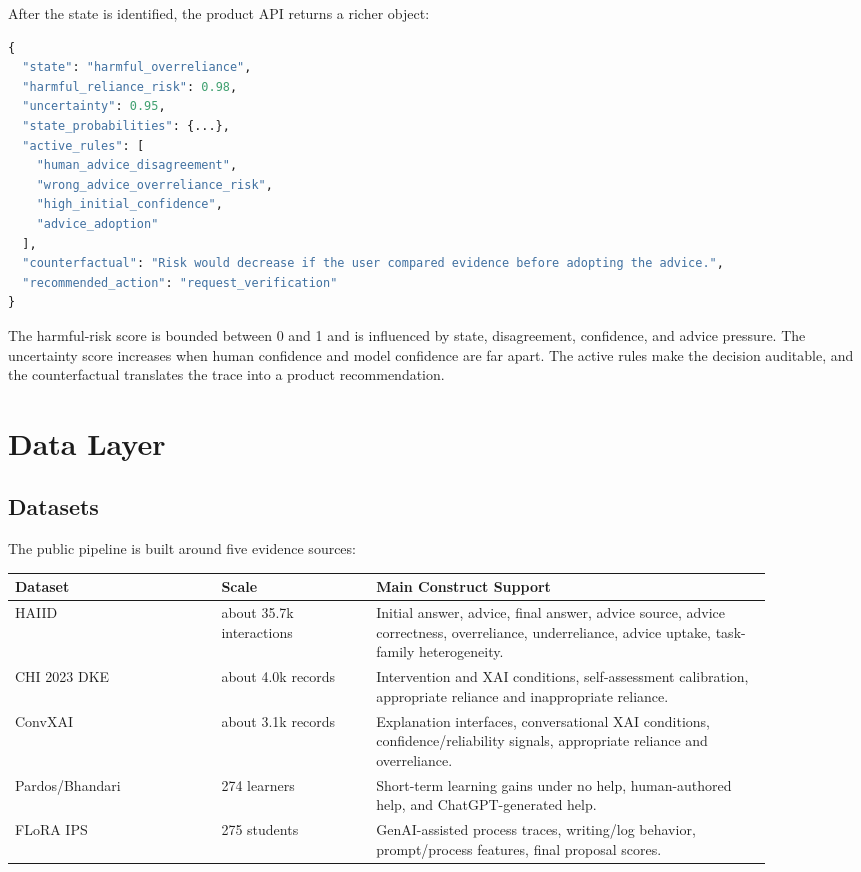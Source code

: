 \documentclass[11pt]{article}
\begin{document}
After the state is identified, the product API returns a richer object:

\begin{lstlisting}[language=Python]
{
  "state": "harmful_overreliance",
  "harmful_reliance_risk": 0.98,
  "uncertainty": 0.95,
  "state_probabilities": {...},
  "active_rules": [
    "human_advice_disagreement",
    "wrong_advice_overreliance_risk",
    "high_initial_confidence",
    "advice_adoption"
  ],
  "counterfactual": "Risk would decrease if the user compared evidence before adopting the advice.",
  "recommended_action": "request_verification"
}
\end{lstlisting}

The harmful-risk score is bounded between 0 and 1 and is influenced by state, disagreement, confidence, and advice pressure. The uncertainty score increases when human confidence and model confidence are far apart. The active rules make the decision auditable, and the counterfactual translates the trace into a product recommendation.

\section{Data Layer}

\subsection{Datasets}

The public pipeline is built around five evidence sources:

\begin{longtable}{p{0.24\linewidth} p{0.18\linewidth} p{0.46\linewidth}}
\toprule
\textbf{Dataset} & \textbf{Scale} & \textbf{Main Construct Support} \\
\midrule
HAIID & about 35.7k interactions & Initial answer, advice, final answer, advice source, advice correctness, overreliance, underreliance, advice uptake, task-family heterogeneity. \\
CHI 2023 DKE & about 4.0k records & Intervention and XAI conditions, self-assessment calibration, appropriate reliance and inappropriate reliance. \\
ConvXAI & about 3.1k records & Explanation interfaces, conversational XAI conditions, confidence/reliability signals, appropriate reliance and overreliance. \\
Pardos/Bhandari & 274 learners & Short-term learning gains under no help, human-authored help, and ChatGPT-generated help. \\
FLoRA IPS & 275 students & GenAI-assisted process traces, writing/log behavior, prompt/process features, final proposal scores. \\
\bottomrule
\end{longtable}
\end{document}
